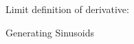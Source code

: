 \documentclass[•]{ximera}
\newcommand{\xyplane}[2]{
\draw[->, style=thick] (-#1,0)--(#1+0.3,0);
\draw[->, style=thick] (0,-#2)--(0,#2+0.3);
\foreach \x in {-#1,...,#1}{\ifthenelse{\x=0}{}{
    {\draw (\x ,-0.1)--(\x ,0.1);
     \draw (\x,0) node[below, font=\footnotesize] {$\x$};
    }}}
\foreach \y in {-#2,...,#2}{\ifthenelse{\y=0}{}{
    {\draw (-0.1,\y)--(0.1,\y);
     \draw (0,\y) node[left, font=\footnotesize] {$\y$};    
    }}}
}
\begin{document}
Limit definition of derivative:\\

\vspace{0.5in}

Generating Sinusoids\\

\vspace{1in}

%
\end{document}

